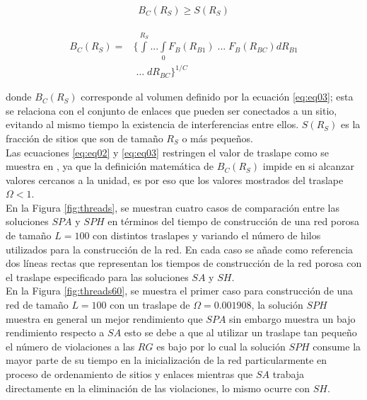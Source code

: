 \begin{equation}
B_C(R_S) \geq S(R_S)
\label{eq:eq02}
\end{equation}

\begin{eqnarray}
\nonumber \\
B_C(R_S) = & \{\int\limits^{R_S} ... \int\limits_{0} F_B(R_{B1})\; ... \; F_B(R_{BC})dR_{B1} \nonumber \\
& \; \ldots \; dR_{BC} \}^{1/C}
\label{eq:eq03}
\end{eqnarray}

donde $B_C(R_S)$ corresponde al volumen definido por la ecuación \ref{eq:eq03}; esta se relaciona con el conjunto de enlaces que pueden ser conectados a un sitio, evitando al mismo tiempo la existencia de interferencias entre ellos. $S(R_S)$ es la fracción de sitios que son de tamaño $R_S$ o más pequeños.\\

Las ecuaciones \ref{eq:eq02} y \ref{eq:eq03} restringen el valor de traslape como se muestra en \cite{ref5}, ya que la definición matemática de $B_C(R_S)$ impide en si alcanzar valores cercanos a la unidad, es por eso que los valores mostrados del traslape $\Omega<1$.\\

En la Figura \ref{fig:threads}, se muestran cuatro casos de comparación entre las soluciones $SPA$ y $SPH$ en términos del tiempo de construcción de una red porosa de tamaño $L=100$ con distintos traslapes y variando el número de hilos utilizados para la construcción de la red. En cada caso se añade como referencia dos líneas rectas que representan los tiempos de construcción de la red porosa con el traslape especificado para las soluciones $SA$ y $SH$.\\

En la Figura \ref{fig:threads60}, se muestra el primer caso para construcción de una red de tamaño $L=100$ con un  traslape de $\Omega=0.001908$, la solución $SPH$ muestra en general un mejor rendimiento que $SPA$ sin embargo muestra un bajo rendimiento respecto a $SA$ esto se debe a que al utilizar un traslape tan pequeño el número de violaciones a las $RG$ es bajo por lo cual la solución $SPH$ consume la mayor parte de su tiempo en la inicialización de la red particularmente en proceso de ordenamiento de sitios y enlaces mientras que $SA$ trabaja directamente en la eliminación de las violaciones, lo mismo ocurre con $SH$.\\

